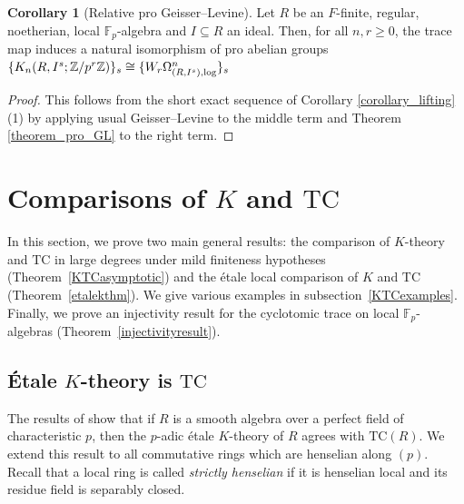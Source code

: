 \documentclass{amsart}
\theoremstyle{definition}
\newtheorem{corollary}[definition]{Corollary}
\newcommand{\bb}{\mathbb}
\newcommand{\sub}[1]{{\mbox{\rm \scriptsize #1}}}
\newcommand{\TC}{\mathrm{TC}}
\begin{document}
\begin{corollary}[Relative pro Geisser--Levine]
Let $R$ be an $F$-finite, regular, noetherian, local  $\bb F_p$-algebra and $I\subseteq R$ an ideal. Then, for all $n,r\ge0$, the trace map induces a natural isomorphism of pro abelian groups $\{K_n(R,I^s;\bb Z/p^r\bb Z)\}_s\cong\{W_r\Omega^n_{(R,I^s),\sub{log}}\}_s$
\end{corollary}
\begin{proof}
This follows from the short exact sequence of Corollary \ref{corollary_lifting}(1) by applying usual Geisser--Levine to the middle term and Theorem \ref{theorem_pro_GL} to the right term.
\end{proof}



\section{Comparisons of $K$ and $\TC$}

In this section, we prove two main general results: the comparison of $K$-theory
and $\TC$ in large degrees under mild finiteness hypotheses (Theorem~\ref{KTCasymptotic}) and
the \'etale local comparison of $K$ and $\TC$ (Theorem~\ref{etalekthm}). We give various
examples in subsection~\ref{KTCexamples}. Finally, we  prove an injectivity result for the
cyclotomic trace on local $\mathbb{F}_p$-algebras
(Theorem~\ref{injectivityresult}).  


\subsection{\'Etale $K$-theory is $\TC$}


The results of \cite{GH} show that if $R$ is a smooth algebra over a perfect
field of characteristic $p$, then the $p$-adic \'etale $K$-theory of $R$
agrees with $\TC(R)$. We extend this result to all commutative rings which are henselian along $(p)$.  
Recall that a 
local ring is called \emph{strictly henselian} if it is henselian local and its
residue field is separably closed. 
\end{document}
